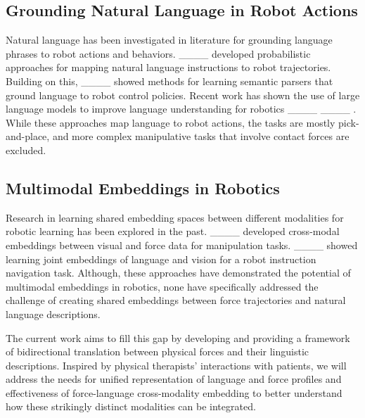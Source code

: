 \subsection{Grounding Natural Language in Robot Actions} 
Natural language has been investigated in literature for grounding language phrases to robot actions and behaviors.  ____ developed probabilistic approaches for mapping natural language instructions to robot trajectories. 
Building on this, ____ showed methods for learning semantic parsers that ground language to robot control policies. Recent work has shown the use of large language models to improve language understanding for robotics ____ ____ . While these approaches map language to robot actions, the tasks are mostly pick-and-place, and more complex manipulative tasks that involve contact forces are excluded. %

\subsection{Multimodal Embeddings in Robotics}
Research in learning shared embedding spaces between different modalities for robotic learning has been explored in the past. ____ developed cross-modal embeddings between visual and force data for manipulation tasks. ____ showed learning joint embeddings of language and vision for a robot instruction navigation task. 
Although, these approaches have demonstrated the potential of multimodal embeddings in robotics, none have specifically addressed the challenge of creating shared embeddings between force trajectories and natural language descriptions. 

The current work aims to fill this gap by developing and providing a framework of bidirectional translation between physical forces and their linguistic descriptions. Inspired by physical therapists' interactions with patients, we will address the needs for unified representation of language and force profiles and effectiveness of force-language cross-modality embedding to better understand how these strikingly distinct modalities can be integrated.

%